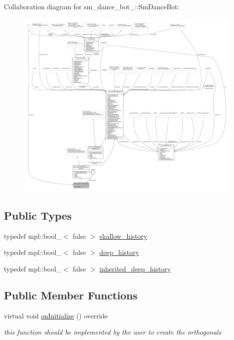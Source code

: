 Collaboration diagram for sm\+\_\+dance\+\_\+bot\+\_\+:\+:Sm\+Dance\+Bot\+:
\nopagebreak
\begin{figure}[H]
\begin{center}
\leavevmode
\includegraphics[width=350pt]{structsm__dance__bot__2_1_1SmDanceBot__coll__graph}
\end{center}
\end{figure}
\subsection*{Public Types}
\begin{DoxyCompactItemize}
\item 
typedef mpl\+::bool\+\_\+$<$ false $>$ \hyperlink{structsm__dance__bot__2_1_1SmDanceBot_a4dec5320acf9a9d93f31b84b0e78a4e4}{shallow\+\_\+history}
\item 
typedef mpl\+::bool\+\_\+$<$ false $>$ \hyperlink{structsm__dance__bot__2_1_1SmDanceBot_a2e6cf41dd05f6fc4b8fa16b249851bfc}{deep\+\_\+history}
\item 
typedef mpl\+::bool\+\_\+$<$ false $>$ \hyperlink{structsm__dance__bot__2_1_1SmDanceBot_a1cb27d660ca8f0cac0d0534718ba0b3e}{inherited\+\_\+deep\+\_\+history}
\end{DoxyCompactItemize}
\subsection*{Public Member Functions}
\begin{DoxyCompactItemize}
\item 
virtual void \hyperlink{structsm__dance__bot__2_1_1SmDanceBot_a61f656a8156a5151d5ceced5bfa80c5c}{on\+Initialize} () override
\begin{DoxyCompactList}\small\item\em this function should be implemented by the user to create the orthogonals \end{DoxyCompactList}\end{DoxyCompactItemize}
